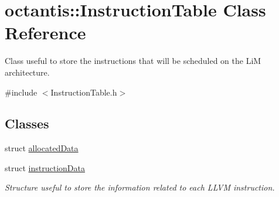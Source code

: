 \hypertarget{classoctantis_1_1InstructionTable}{}\section{octantis\+:\+:Instruction\+Table Class Reference}
\label{classoctantis_1_1InstructionTable}


Class useful to store the instructions that will be scheduled on the LiM architecture.  




{\ttfamily \#include $<$Instruction\+Table.\+h$>$}

\subsection*{Classes}
\begin{DoxyCompactItemize}
\item 
struct \hyperlink{structoctantis_1_1InstructionTable_1_1allocatedData}{allocated\+Data}
\item 
struct \hyperlink{structoctantis_1_1InstructionTable_1_1instructionData}{instruction\+Data}
\begin{DoxyCompactList}\small\item\em Structure useful to store the information related to each L\+L\+VM instruction. \end{DoxyCompactList}\end{DoxyCompactItemize}
